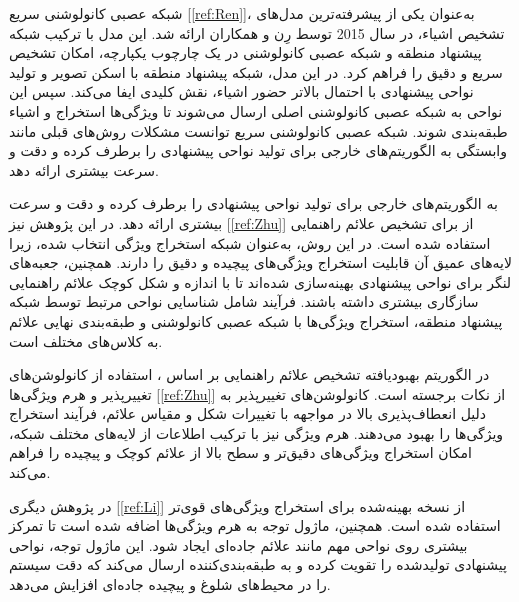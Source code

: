 شبکه عصبی کانولوشنی سریع [\ref{ref:Ren}]، به‌عنوان یکی از پیشرفته‌ترین مدل‌های تشخیص اشیاء، در سال 2015 توسط رِن و همکاران ارائه شد. این مدل با ترکیب شبکه پیشنهاد منطقه و شبکه عصبی کانولوشنی در یک چارچوب یکپارچه، امکان تشخیص سریع و دقیق را فراهم کرد. در این مدل، شبکه پیشنهاد منطقه با اسکن تصویر و تولید نواحی پیشنهادی با احتمال بالاتر حضور اشیاء، نقش کلیدی ایفا می‌کند. سپس این نواحی به شبکه عصبی کانولوشنی اصلی ارسال می‌شوند تا ویژگی‌ها استخراج و اشیاء طبقه‌بندی شوند. شبکه عصبی کانولوشنی سریع توانست مشکلات روش‌های قبلی مانند وابستگی به الگوریتم‌های خارجی برای تولید نواحی پیشنهادی را برطرف کرده و دقت و سرعت بیشتری ارائه دهد.

به الگوریتم‌های خارجی برای تولید نواحی پیشنهادی را برطرف کرده و دقت و سرعت بیشتری ارائه دهد.  
در این پژوهش نیز [\ref{ref:Zhu}] از  برای تشخیص علائم راهنمایی استفاده شده است. در این روش،  به‌عنوان شبکه استخراج ویژگی انتخاب شده، زیرا لایه‌های عمیق آن قابلیت استخراج ویژگی‌های پیچیده و دقیق را دارند. همچنین، جعبه‌های لنگر برای نواحی پیشنهادی بهینه‌سازی شده‌اند تا با اندازه و شکل کوچک علائم راهنمایی سازگاری بیشتری داشته باشند. فرآیند شامل شناسایی نواحی مرتبط توسط شبکه پیشنهاد منطقه، استخراج ویژگی‌ها با شبکه عصبی کانولوشنی و طبقه‌بندی نهایی علائم به کلاس‌های مختلف است.  

در الگوریتم بهبود‌یافته تشخیص علائم راهنمایی بر اساس ، استفاده از کانولوشن‌های تغییرپذیر و هرم ویژگی‌ها [\ref{ref:Zhu}] از نکات برجسته است. کانولوشن‌های تغییرپذیر به دلیل انعطاف‌پذیری بالا در مواجهه با تغییرات شکل و مقیاس علائم، فرآیند استخراج ویژگی‌ها را بهبود می‌دهند. هرم ویژگی نیز با ترکیب اطلاعات از لایه‌های مختلف شبکه، امکان استخراج ویژگی‌های دقیق‌تر و سطح بالا از علائم کوچک و پیچیده را فراهم می‌کند.  

در پژوهش دیگری [\ref{ref:Li}] از نسخه بهینه‌شده  برای استخراج ویژگی‌های قوی‌تر استفاده شده است. همچنین، ماژول توجه به هرم ویژگی‌ها اضافه شده است تا تمرکز بیشتری روی نواحی مهم مانند علائم جاده‌ای ایجاد شود. این ماژول توجه، نواحی پیشنهادی تولید‌شده را تقویت کرده و به طبقه‌بندی‌کننده ارسال می‌کند که دقت سیستم را در محیط‌های شلوغ و پیچیده جاده‌ای افزایش می‌دهد.  

